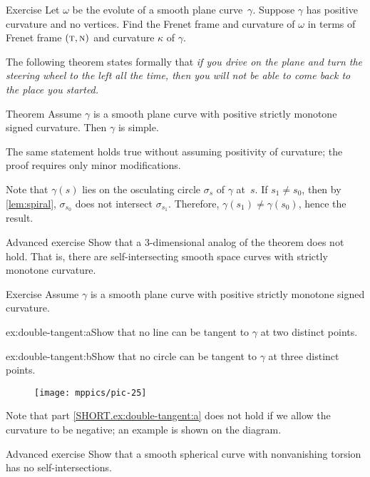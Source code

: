 \begin{thm}{Exercise}\label{ex:evolute}
Let $\omega$ be the evolute of a smooth plane curve~$\gamma$.
Suppose $\gamma$ has positive curvature and no vertices.
Find the Frenet frame and curvature of \(\omega\) in terms of Frenet frame $(\text{\sc{t}},\text{\sc{n}})$ and curvature $\kappa$ of \(\gamma\).
\end{thm}

The following theorem states formally that 
\textit{if you drive on the plane and turn the steering wheel to the left all the time,
then you will not be able to come back to the place you started.}


\begin{thm}{Theorem}\label{thm:spiral}
Assume $\gamma$ is a smooth plane curve with positive strictly monotone signed curvature. 
Then $\gamma$ is simple.
\end{thm}

The same statement holds true without assuming positivity of curvature; the proof requires only minor modifications.

Note that $\gamma(s)$ lies on the osculating circle $\sigma_s$ of $\gamma$ at~$s$.
If $s_1\ne s_0$, then by \ref{lem:spiral}, $\sigma_{s_0}$ does not intersect $\sigma_{s_1}$.
Therefore, $\gamma(s_1)\ne \gamma(s_0)$,
hence the result.\qeds

\begin{thm}{Advanced exercise}\label{ex:3D-spiral}
Show that a 3-dimensional analog of the theorem does not hold.
That is, there are self-intersecting smooth space curves with strictly monotone curvature.
\end{thm}

\begin{thm}{Exercise}\label{ex:double-tangent}
Assume $\gamma$ is a smooth plane curve with positive strictly monotone signed curvature.

\begin{subthm}{ex:double-tangent:a}Show that no line can be tangent to $\gamma$ at two distinct points.
\end{subthm}

\begin{subthm}{ex:double-tangent:b}Show that no circle can be tangent to $\gamma$ at three distinct points. 
\end{subthm}

\end{thm}

{

\begin{wrapfigure}{o}{25 mm}
\vskip-4mm
\centering
\texttt{[image: mppics/pic-25]}
\vskip0mm
\end{wrapfigure}

Note that part \ref{SHORT.ex:double-tangent:a} does not hold if we allow the curvature to be negative; an example is shown on the diagram.

}

\begin{thm}{Advanced exercise}\label{ex:spherical-spiral}
Show that a smooth spherical curve with nonvanishing torsion has no self-intersections.
\end{thm}


